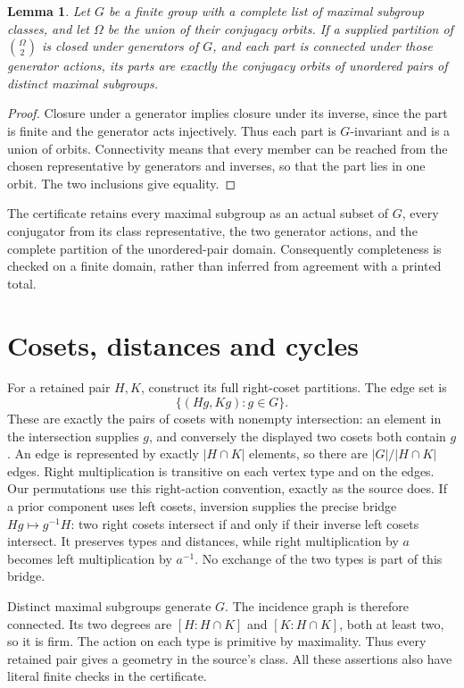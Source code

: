 \documentclass[11pt]{article}
\newtheorem{lemma}[theorem]{Lemma}
\begin{document}
\begin{lemma}
Let $G$ be a finite group with a complete list of maximal subgroup classes,
and let $\Omega$ be the union of their conjugacy orbits. If a supplied
partition of $\binom{\Omega}{2}$ is closed under generators of $G$, and
each part is connected under those generator actions, its parts are exactly
the conjugacy orbits of unordered pairs of distinct maximal subgroups.
\end{lemma}
\begin{proof}
Closure under a generator implies closure under its inverse, since the
part is finite and the generator acts injectively. Thus each part is
$G$-invariant and is a union of orbits. Connectivity means that every member
can be reached from the chosen representative by generators and inverses,
so that the part lies in one orbit. The two inclusions give equality.
\end{proof}
The certificate retains every maximal subgroup as an actual subset of $G$,
every conjugator from its class representative, the two generator actions,
and the complete partition of the unordered-pair domain. Consequently
completeness is checked on a finite domain, rather than inferred from
agreement with a printed total.

\section{Cosets, distances and cycles}
For a retained pair $H,K$, construct its full right-coset partitions.
The edge set is
\[
                 \{(Hg,Kg):g\in G\}.
\]
These are exactly the pairs of cosets with nonempty intersection: an element
in the intersection supplies $g$, and conversely the displayed two cosets
both contain $g$. An edge is represented by exactly $|H\cap K|$ elements,
so there are $|G|/|H\cap K|$ edges. Right multiplication is transitive on
each vertex type and on the edges. Our permutations use this right-action
convention, exactly as the source does. If a prior component uses left
cosets, inversion supplies the precise bridge
$Hg\mapsto g^{-1}H$: two right cosets intersect if and only if their inverse
left cosets intersect. It preserves types and distances, while right
multiplication by $a$ becomes left multiplication by $a^{-1}$. No exchange
of the two types is part of this bridge.

Distinct maximal subgroups generate $G$. The incidence graph is therefore
connected. Its two degrees are $[H:H\cap K]$ and $[K:H\cap K]$, both at
least two, so it is firm. The action on each type is primitive by maximality.
Thus every retained pair gives a geometry in the source's class.
All these assertions also have literal finite checks in the certificate.
\end{document}
